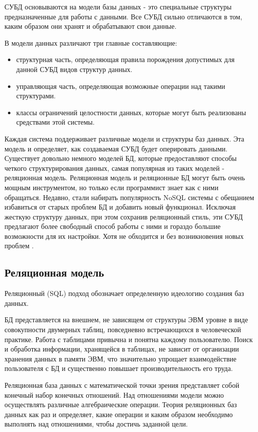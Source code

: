 СУБД основываются на модели базы данных - это специальные структуры предназначенные для работы с данными. Все СУБД сильно отличаются в том, каким образом они хранят и обрабатывают свои данные.

В модели данных различают три главные составляющие:
\begin{itemize}
	\item структурная часть, определяющая правила порождения допустимых для данной СУБД видов структур данных.
	\item управляющая часть, определяющая возможные операции над такими структурами.
	\item классы ограничений целостности данных, которые могут быть реализованы средствами этой системы.
\end{itemize}


Каждая система поддерживает различные модели и структуры баз данных. Эта модель и определяет, как создаваемая СУБД будет оперировать данными. Существует довольно немного моделей БД, которые предоставляют способы четкого структурирования данных, самая популярная из таких моделей - реляционная модель.
Реляционная модель и реляционные БД могут быть очень мощным инструментом, но только если программист знает как с ними обращаться. Недавно, стали набирать популярность NoSQL системы с обещанием избавиться от старых проблем БД и добавить новый функционал. Исключая жесткую структуру данных, при этом сохранив реляционный стиль, эти СУБД предлагают более свободный способ работы с ними и гораздо большие возможности для их настройки. Хотя не обходится и без возникновения новых проблем \cite{sqlnsql}.

\subsection{Реляционная модель}
Реляционный (SQL) подход обозначает определенную идеологию создания баз данных.

БД представляется на внешнем, не зависящем от структуры ЭВМ уровне в виде совокупности двумерных таблиц, повседневно встречающихся в человеческой практике. Работа с таблицами привычна и понятна каждому пользователю. Поиск и обработка информации, хранящейся в таблицах, не зависит от организации хранения данных в памяти ЭВМ, что значительно упрощает взаимодействие пользователя с БД и существенно повышает производительность его труда.

Реляционная база данных с математической точки зрения представляет собой конечный набор конечных отношений. Над отношениями модели можно осуществлять различные алгебраические операции. Теория реляционных баз данных как раз и определяет, какие операции и каким образом необходимо выполнять над отношениями, чтобы достичь заданной цели.

